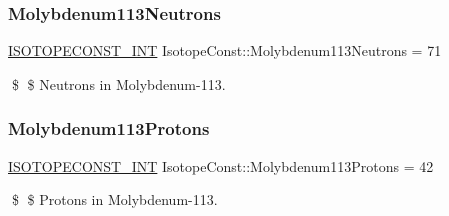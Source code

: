 \subsubsection{\texorpdfstring{Molybdenum113\+Neutrons}{Molybdenum113Neutrons}}
{\footnotesize\ttfamily \mbox{\hyperlink{group___isotope_const-_macros_ga5f18360b3e99483a35c32d789e62621c}{I\+S\+O\+T\+O\+P\+E\+C\+O\+N\+S\+T\+\_\+\+I\+NT}} Isotope\+Const\+::\+Molybdenum113\+Neutrons = 71}

\$ \$ Neutrons in Molybdenum-\/113. \mbox{\label{group___isotope_const-_molybdenum-_mo113_ga95fcf35c84297bb88f55171637397f4a}} 
\subsubsection{\texorpdfstring{Molybdenum113\+Protons}{Molybdenum113Protons}}
{\footnotesize\ttfamily \mbox{\hyperlink{group___isotope_const-_macros_ga5f18360b3e99483a35c32d789e62621c}{I\+S\+O\+T\+O\+P\+E\+C\+O\+N\+S\+T\+\_\+\+I\+NT}} Isotope\+Const\+::\+Molybdenum113\+Protons = 42}

\$ \$ Protons in Molybdenum-\/113. 